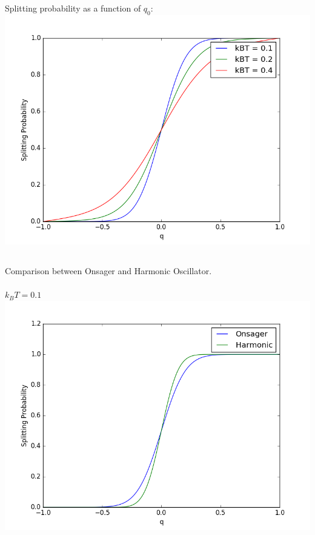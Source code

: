 \documentclass[11pt, oneside]{article}   	%
\begin{document}
\subsection{}
Splitting probability as a function of $q_0$:
\includegraphics[scale = 0.5]{Onsager.png}

\subsection{}
Comparison between Onsager and Harmonic Oscillator.
\paragraph{}
$k_B T = 0.1$
\includegraphics[scale = 0.5]{kbt1.png}
\end{document}
